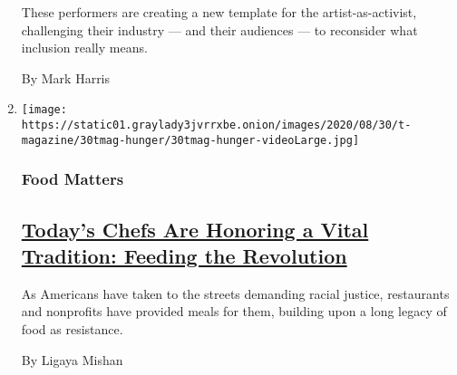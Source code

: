 \begin{enumerate}
  These performers are creating a new template for the
  artist-as-activist, challenging their industry --- and their audiences
  --- to reconsider what inclusion really means.

  By Mark Harris
\item
  \texttt{[image: https://static01.graylady3jvrrxbe.onion/images/2020/08/30/t-magazine/30tmag-hunger/30tmag-hunger-videoLarge.jpg]}

  \hypertarget{food-matters}{%
  \subsubsection{Food Matters}\label{food-matters}}

  \hypertarget{todays-chefs-are-honoring-a-vital-tradition-feeding-the-revolution}{%
  \subsection{\texorpdfstring{\href{/2020/08/28/t-magazine/food-protest-revolution.html}{Today's
  Chefs Are Honoring a Vital Tradition: Feeding the
  Revolution}}{Today's Chefs Are Honoring a Vital Tradition: Feeding the Revolution}}\label{todays-chefs-are-honoring-a-vital-tradition-feeding-the-revolution}}

  As Americans have taken to the streets demanding racial justice,
  restaurants and nonprofits have provided meals for them, building upon
  a long legacy of food as resistance.

  By Ligaya Mishan
\end{enumerate}

